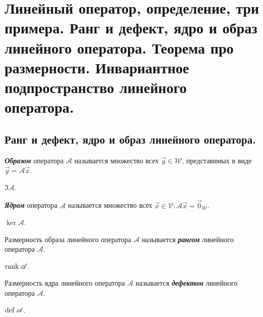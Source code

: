\section{
    Линейный оператор, определение, три примера. Ранг и дефект, ядро и образ линейного оператора. Теорема про размерности. Инвариантное подпространство линейного оператора.  
}

\subsection{
    Ранг и дефект, ядро и образ линейного оператора.
}

\begin{definition}
    \textbf{\textit{Образом}} оператора $\mathscr{A}$ называется множество всех $\vec{y} \in \mathcal{W}$, представимых в виде $\vec{y} = \mathscr{A}\vec{x}$.
\end{definition}

\begin{designation}
    $\Im \mathscr{A}$.
\end{designation}

\begin{definition}
    \textbf{\textit{Ядром}} оператора $\mathscr{A}$ называется множество всех $\vec{x} \in \mathcal{V} \colon \mathscr{A}\vec{x} = \vec{0}_{\mathcal{W}}$.
\end{definition}

\begin{designation}
    $\ker \mathscr{A}$.
\end{designation}

\begin{definition}
    Размерность образа линейного оператора $\mathscr{A}$ называется \textbf{\textit{рангом}} линейного оператора $\mathscr{A}$. 
\end{definition}

\begin{designation}
    $\operatorname{\mathop{\mathrm{rank}}} \mathscr{A}$.
\end{designation}

\begin{definition}
    Размерность ядра линейного оператора $\mathscr{A}$ называется \textbf{\textit{дефектом}} линейного оператора $\mathscr{A}$. 
\end{definition}

\begin{designation}
    $\operatorname{\mathop{\mathrm{def}}} \mathscr{A}$.
\end{designation}
